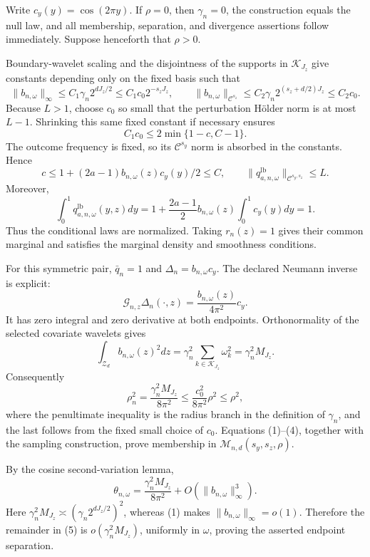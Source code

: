 Write \(c_y(y)=\cos(2\pi y)\).  If \(\rho=0\), then \(\gamma_n=0\), the construction equals the null law, and all membership, separation, and divergence assertions follow immediately.  Suppose henceforth that \(\rho>0\).

Boundary-wavelet scaling and the disjointness of the supports in \(\mathcal K_{J_z}\) give constants depending only on the fixed basis such that
\[
\|b_{n,\omega}\|_\infty
\le C_1\gamma_n2^{dJ_z/2}
\le C_1c_0 2^{-s_zJ_z},
\qquad
\|b_{n,\omega}\|_{\mathcal C^{s_z}}
\le C_2\gamma_n2^{(s_z+d/2)J_z}
\le C_2c_0.                                                               \tag{1}
\]
Because \(L>1\), choose \(c_0\) so small that the perturbation H\"older norm is at most \(L-1\).  Shrinking this same fixed constant if necessary ensures
\[
C_1c_0\le2\min\{1-c,C-1\}.
\]
The outcome frequency is fixed, so its \(\mathcal C^{s_y}\) norm is absorbed in the constants.  Hence
\[
c\le1+(2a-1)b_{n,\omega}(z)c_y(y)/2\le C,
\qquad
\|q_{a,n,\omega}^{\mathrm{lb}}\|_{\mathcal C^{s_y,s_z}}\le L.             \tag{2}
\]
Moreover,
\[
\int_0^1q_{a,n,\omega}^{\mathrm{lb}}(y,z)dy
=1+\frac{2a-1}{2}b_{n,\omega}(z)\int_0^1c_y(y)dy=1.                       \tag{3}
\]
Thus the conditional laws are normalized.  Taking \(r_n(z)=1\) gives their common marginal and satisfies the marginal density and smoothness conditions.

For this symmetric pair, \(\bar q_n=1\) and \(\Delta_n=b_{n,\omega}c_y\).  The declared Neumann inverse is explicit:
\[
\mathcal G_{n,z}\Delta_n(\cdot,z)
=\frac{b_{n,\omega}(z)}{4\pi^2}c_y.
\]
It has zero integral and zero derivative at both endpoints.  Orthonormality of the selected covariate wavelets gives
\[
\int_{\mathcal Z_d}b_{n,\omega}(z)^2dz
=\gamma_n^2\sum_{k\in\mathcal K_{J_z}}\omega_k^2
=\gamma_n^2M_{J_z}.
\]
Consequently
\[
\rho_n^2
=\frac{\gamma_n^2M_{J_z}}{8\pi^2}
\le\frac{c_0^2}{8\pi^2}\rho^2
\le\rho^2,                                                               \tag{4}
\]
where the penultimate inequality is the radius branch in the definition of \(\gamma_n\), and the last follows from the fixed small choice of \(c_0\).  Equations (1)--(4), together with the sampling construction, prove membership in \(\mathcal M_{n,d}(s_y,s_z,\rho)\).

By the cosine second-variation lemma,
\[
\theta_{n,\omega}
=\frac{\gamma_n^2M_{J_z}}{8\pi^2}+O(\|b_{n,\omega}\|_\infty^3).           \tag{5}
\]
Here \(\gamma_n^2M_{J_z}\asymp(\gamma_n2^{dJ_z/2})^2\), whereas (1) makes \(\|b_{n,\omega}\|_\infty=o(1)\).  Therefore the remainder in (5) is \(o(\gamma_n^2M_{J_z})\), uniformly in \(\omega\), proving the asserted endpoint separation.

